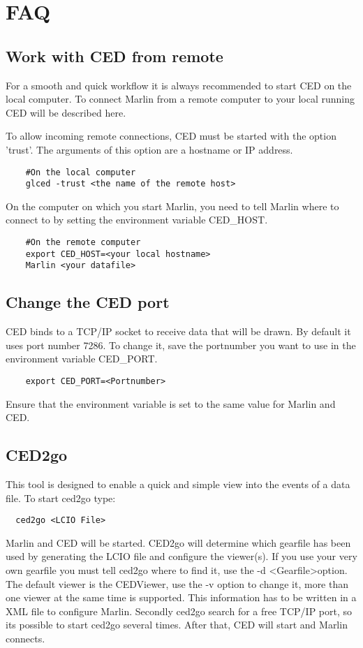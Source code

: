 \documentclass[a4paper,10pt]{article}
\begin{document}
\section{FAQ}
\subsection{Work with CED from remote}
For a smooth and quick workflow it is always recommended to start CED on the local computer. 
To connect Marlin from a remote computer to your local running CED will be described here.

To allow incoming remote connections, CED must be started with the option 'trust'. The arguments of this option are a hostname or IP address.
\begin{verbatim}
    #On the local computer
    glced -trust <the name of the remote host>
\end{verbatim}
On the computer on which you start Marlin, you need to tell Marlin where to connect to by setting the environment variable CED\_HOST.
\begin{verbatim}
    #On the remote computer
    export CED_HOST=<your local hostname>
    Marlin <your datafile>
\end{verbatim}

\subsection{Change the CED port}
CED binds to a TCP/IP socket to receive data that will be drawn. By default it uses port number 7286. To change it, save the portnumber you want to use in the environment variable CED\_PORT. 
\begin{verbatim}
    export CED_PORT=<Portnumber>
\end{verbatim}
Ensure that the environment variable is set to the same value for Marlin and CED.

\subsection{CED2go}
This tool is designed to enable a quick and simple view into the events of a data file. To start ced2go type:
 \begin{verbatim}
  ced2go <LCIO File>
 \end{verbatim}
Marlin and CED will be started.
\newline\newline
CED2go will determine which gearfile has been used by generating the LCIO file and configure the viewer(s). If you use your very own gearfile you must tell ced2go where to find it, use the -d \textless Gearfile\textgreater   option. The default viewer is the CEDViewer, use the -v option to change it, more than one viewer at the same time is supported. This information has to be written in a XML file to configure Marlin. Secondly ced2go  search for a free TCP/IP port, so its possible to start ced2go several times. After that, CED will start and Marlin connects.
 
\end{document}
